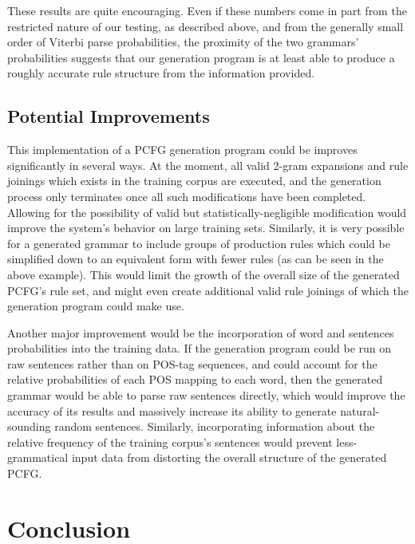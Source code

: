 \documentclass[paper=a4, fontsize=11pt]{scrartcl} %
\numberwithin{equation}{section} %
\numberwithin{figure}{section} %
\numberwithin{table}{section} %
\begin{document}
These results are quite encouraging. Even if these numbers come in part from the restricted nature of our testing, as described above, and from the generally small order of Viterbi parse probabilities, the proximity of the two grammars' probabilities suggests that our generation program is at least able to produce a roughly accurate rule structure from the information provided.


\subsection{Potential Improvements}

This implementation of a PCFG generation program could be improves significantly in several ways. At the moment, all valid 2-gram expansions and rule joinings which exists in the training corpus are executed, and the generation process only terminates once all such modifications have been completed. Allowing for the possibility of valid but statistically-negligible modification would improve the system's behavior on large training sets. Similarly, it is very possible for a generated grammar to include groups of production rules which could be simplified down to an equivalent form with fewer rules (as can be seen in the above example). This would limit the growth of the overall size of the generated PCFG's rule set, and might even create additional valid rule joinings of which the generation program could make use.

Another major improvement would be the incorporation of word and sentences probabilities into the training data. If the generation program could be run on raw sentences rather than on POS-tag sequences, and could account for the relative probabilities of each POS mapping to each word, then the generated grammar would be able to parse raw sentences directly, which would improve the accuracy of its results and massively increase its ability to generate natural-sounding random sentences. Similarly, incorporating information about the relative frequency of the training corpus's sentences would prevent less-grammatical input data from distorting the overall structure of the generated PCFG.

\section{Conclusion}
\end{document}
